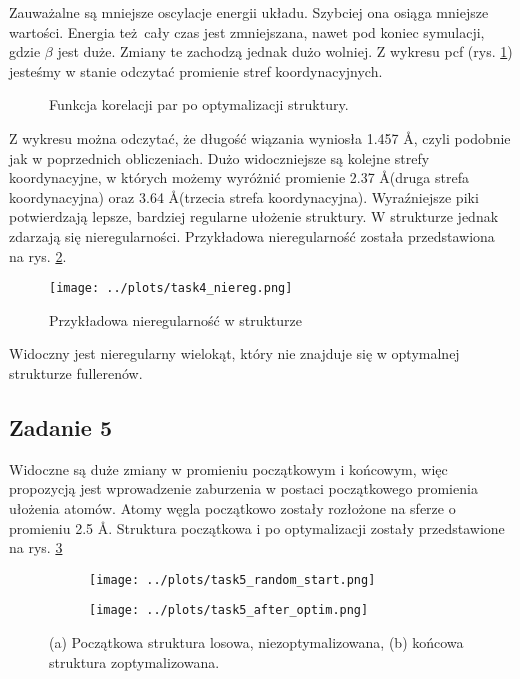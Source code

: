 \documentclass[a4paper,12pt]{article}
\begin{document}
	\noindent Zauważalne są mniejsze oscylacje energii układu. 
	Szybciej ona osiąga mniejsze wartości.
	Energia też cały czas jest zmniejszana, nawet pod koniec symulacji, gdzie $\beta$ jest duże.
	Zmiany te zachodzą jednak dużo wolniej. 
	Z wykresu pcf (rys. \ref{task4_pcf}) jesteśmy w stanie odczytać promienie stref koordynacyjnych.
	\begin{figure}[h]
		\centering
		
		\caption{Funkcja korelacji par po optymalizacji struktury.}
		\label{task4_pcf}
	\end{figure}
	
	\noindent Z wykresu można odczytać, że długość wiązania wyniosła 1.457 \AA, czyli podobnie jak w poprzednich obliczeniach. 
	Dużo widoczniejsze są kolejne strefy koordynacyjne, w których możemy wyróżnić promienie 2.37 \AA (druga strefa koordynacyjna) oraz 3.64 \AA (trzecia strefa koordynacyjna).
	Wyraźniejsze piki potwierdzają lepsze, bardziej regularne ułożenie struktury.
	W strukturze jednak zdarzają się nieregularności.
	Przykładowa nieregularność została przedstawiona na rys. \ref{task4_niedobrze}.
	\begin{figure}[h]
		\centering
		\texttt{[image: ../plots/task4\_niereg.png]}
		\caption{Przykładowa nieregularność w strukturze}
		\label{task4_niedobrze}
	\end{figure}
	Widoczny jest nieregularny wielokąt, który nie znajduje się w optymalnej strukturze fullerenów.
	
	\subsection*{Zadanie 5}
	
	Widoczne są duże zmiany w promieniu początkowym i końcowym, więc propozycją jest wprowadzenie zaburzenia w postaci początkowego promienia ułożenia atomów.
	Atomy węgla początkowo zostały rozłożone na sferze o promieniu 2.5 \AA.
	Struktura początkowa i po optymalizacji zostały przedstawione na rys. \ref{task5_optim}
	\begin{figure}[H]
		\centering
		\begin{subfigure}{0.49\textwidth}
			\centering 
			\texttt{[image: ../plots/task5\_random\_start.png]}
			\caption{}
		\end{subfigure}
		\begin{subfigure}{0.49\textwidth}
			\centering 
			\texttt{[image: ../plots/task5\_after\_optim.png]}
			\caption{}
		\end{subfigure}
		\caption{(a) Początkowa struktura losowa, niezoptymalizowana, (b) końcowa struktura zoptymalizowana.}
		\label{task5_optim}
	\end{figure}
	
\end{document}
